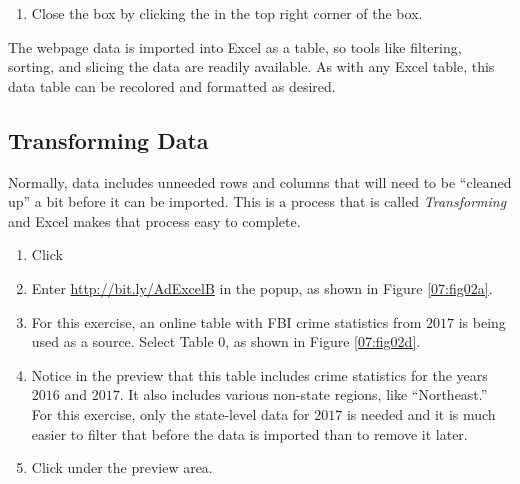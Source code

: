 \begin{enumerate}[resume]
	\item Close the  box by clicking the  in the top right corner of the box.
\end{enumerate}

The webpage data is imported into Excel as a table, so tools like filtering, sorting, and slicing the data are readily available. As with any Excel table, this data table can be recolored and formatted as desired.

\subsection{Transforming Data}

Normally, data includes unneeded rows and columns that will need to be ``cleaned up'' a bit before it can be imported. This is a process that is called \textit{Transforming} and Excel makes that process easy to complete. 

\begin{enumerate}
	\item Click 
	\item Enter \url{http://bit.ly/AdExcelB} in the  popup, as shown in Figure \ref{07:fig02a}.
	\item For this exercise, an online table with FBI crime statistics from $ 2017 $ is being used as a source. Select Table $ 0 $, as shown in Figure \ref{07:fig02d}.
	\item Notice in the preview that this table includes crime statistics for the years $ 2016 $ and $ 2017 $. It also includes various non-state regions, like ``Northeast.'' For this exercise, only the state-level data for $ 2017 $ is needed and it is much easier to filter that before the data is imported than to remove it later.
	\item Click  under the preview area.
\end{enumerate}

